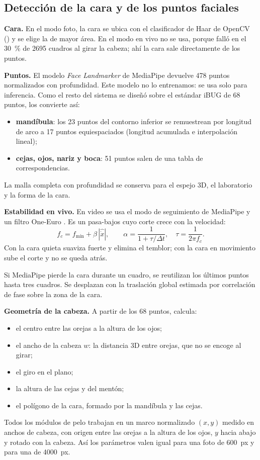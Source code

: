 \subsection{Detección de la cara y de los puntos faciales}
\label{sec:deteccion}

\textbf{Cara.} En el modo foto, la cara se ubica con el clasificador de Haar de OpenCV \cite{viola2001} () y se elige la de mayor área. En el modo en vivo no se usa, porque falló en el 30~\% de 2695 cuadros al girar la cabeza; ahí la cara sale directamente de los puntos.

\textbf{Puntos.} El modelo \emph{Face Landmarker} de MediaPipe \cite{kartynnik2019} devuelve 478 puntos normalizados con profundidad. Este modelo no lo entrenamos: se usa solo para inferencia. Como el resto del sistema se diseñó sobre el estándar iBUG de 68 puntos,  los convierte así:
\begin{itemize}
  \item \textbf{mandíbula}: los 23 puntos del contorno inferior se remuestrean por longitud de arco a 17 puntos equiespaciados (longitud acumulada e interpolación lineal);
  \item \textbf{cejas, ojos, nariz y boca}: 51 puntos salen de una tabla de correspondencias.
\end{itemize}
La malla completa con profundidad se conserva para el espejo 3D, el laboratorio y la forma de la cara.

\textbf{Estabilidad en vivo.} En video se usa el modo de seguimiento de MediaPipe y un filtro One-Euro \cite{casiez2012}. Es un pasa-bajos cuyo corte crece con la velocidad:
\begin{equation}
  f_c=f_{\min}+\beta\,|\hat{\dot x}|,\qquad \alpha=\frac{1}{1+\tau/\Delta t},\quad \tau=\frac{1}{2\pi f_c}.
\end{equation}
Con la cara quieta suaviza fuerte y elimina el temblor; con la cara en movimiento sube el corte y no se queda atrás.

Si MediaPipe pierde la cara durante un cuadro, se reutilizan los últimos puntos hasta tres cuadros. Se desplazan con la traslación global estimada por correlación de fase sobre la zona de la cara.

\textbf{Geometría de la cabeza.} A partir de los 68 puntos,  calcula:
\begin{itemize}
  \item el centro entre las orejas a la altura de los ojos;
  \item el ancho de la cabeza $w$: la distancia 3D entre orejas, que no se encoge al girar;
  \item el giro en el plano;
  \item la altura de las cejas y del mentón;
  \item el polígono de la cara, formado por la mandíbula y las cejas.
\end{itemize}
Todos los módulos de pelo trabajan en un marco normalizado $(x,y)$ medido en anchos de cabeza, con origen entre las orejas a la altura de los ojos, $y$ hacia abajo y rotado con la cabeza. Así los parámetros valen igual para una foto de 600~px y para una de 4000~px.

